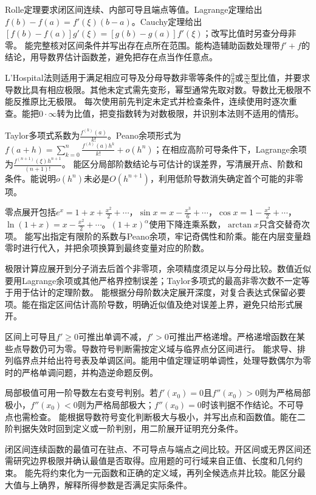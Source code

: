 {Rolle定理要求闭区间连续、内部可导且端点等值。Lagrange定理给出$f(b)-f(a)=f'(\xi)(b-a)$。Cauchy定理给出$[f(b)-f(a)]g'(\xi)=[g(b)-g(a)]f'(\xi)$；改写比值时另查分母非零。}
{能完整核对区间条件并写出存在点所在范围。能构造辅助函数处理带$f'+f$的结论，用导数界估计函数差，避免把存在点当作任意点。}

{L'Hospital法则适用于满足相应可导及分母导数非零等条件的$\frac00$或$\frac\infty\infty$型比值，并要求导数比具有相应极限。其他未定式需先变形，幂型通常先取对数。导数比无极限不能反推原比无极限。}
{每次使用前先判定未定式并检查条件，连续使用时逐次重查。能把$0\cdot\infty$转为比值，把变指数转为对数极限，并识别本法则不适用的情形。}

{Taylor多项式系数为$\frac{f^{(k)}(a)}{k!}$。Peano余项形式为$f(a+h)=\sum_{k=0}^n\frac{f^{(k)}(a)h^k}{k!}+o(h^n)$；在相应高阶可导条件下，Lagrange余项为$\frac{f^{(n+1)}(\xi)h^{n+1}}{(n+1)!}$。}
{能区分局部阶数结论与可估计的误差界，写清展开点、阶数和条件。能说明$o(h^n)$未必是$O(h^{n+1})$，利用低阶导数消失确定首个可能的非零项。}

{零点展开包括$e^x=1+x+\frac{x^2}{2}+\cdots$，$\sin x=x-\frac{x^3}{6}+\cdots$，$\cos x=1-\frac{x^2}{2}+\cdots$，$\ln(1+x)=x-\frac{x^2}{2}+\cdots$。$(1+x)^\alpha$使用下降连乘系数，$\arctan x$只含交替奇次项。}
{能写出指定有限阶的系数与Peano余项，牢记奇偶性和阶乘。能在内层变量趋零时进行代入，并把余项换算到最终变量对应的阶数。}

{极限计算应展开到分子消去后首个非零项，余项精度须足以与分母比较。数值近似要用Lagrange余项或其他严格界控制误差；Taylor多项式的最高非零次数不一定等于用于估计的定理阶数。}
{能根据分母阶数决定展开深度，对复合表达式保留必要项。能在指定区间估计高阶导数，明确近似值及绝对误差上界，避免只给形式展开。}

{区间上可导且$f'\ge0$可推出单调不减，$f'>0$可推出严格递增。严格递增函数在某些点导数仍可为零。导数符号判断需按定义域与临界点分区间进行。}
{能求导、排列临界点并给出符号表及单调区间。能用中值定理证明单调性，处理导数偶尔为零时的严格单调问题，并构造逆命题反例。}

{局部极值可用一阶导数左右变号判别。若$f'(x_0)=0$且$f''(x_0)>0$则为严格局部极小，$f''(x_0)<0$则为严格局部极大；$f''(x_0)=0$时该判据不作结论。不可导点也需检查。}
{能根据导数符号变化判断极大与极小，并写出点和函数值。能在二阶判据失效时回到定义或一阶判别，用二阶展开证明充分条件。}

{闭区间连续函数的最值可在驻点、不可导点与端点之间比较。开区间或无界区间还需研究边界极限并确认最值是否取得。应用题的可行域来自正值、长度和几何约束。}
{能先将约束化为一元函数和正确的定义域，再列全候选点并比较。能区分最大值与上确界，解释所得参数是否满足实际条件。}

